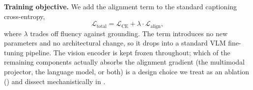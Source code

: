 \textbf{Training objective.}
We add the alignment term to the standard captioning cross-entropy,
\begin{equation}
\mathcal{L}_{\text{total}} = \mathcal{L}_{\text{CE}} + \lambda \cdot \mathcal{L}_{\text{align}},
\label{eq:total}
\end{equation}
where $\lambda$ trades off fluency against grounding. The term introduces no new parameters and no architectural change, so it drops into a standard VLM fine-tuning pipeline. The vision encoder is kept frozen throughout; which of the remaining components actually absorbs the alignment gradient (the multimodal projector, the language model, or both) is a design choice we treat as an ablation () and dissect mechanistically in .
